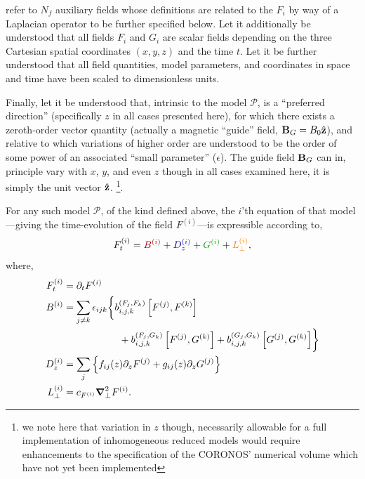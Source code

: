 \documentclass[12pt, letterpaper, oneside, leqno, openright]{memoir}
\newcommand{\coronos}{\textsf{CORONOS}}
\newcommand{\pmodel}{\mathscr{P}}
\begin{document}
refer to $N_f$ auxiliary fields whose definitions are related to the $F_i$ by
way of a Laplacian operator to be further specified below. Let it additionally
be understood that all fields $F_i$ and $G_i$ are scalar fields depending on
the three Cartesian spatial coordinates $(x,y,z)$ and the time $t$. Let it be
further understood that all field quantities, model parameters, and coordinates
in space and time have been scaled to dimensionless units. 
%
\par
%
Finally, let it be understood that, intrinsic to the model $\pmodel$, is a
``preferred direction'' (specifically $z$ in all cases presented here),
for which there exists a zeroth-order vector quantity (actually a magnetic
``guide'' field, $\mathbf{B}_G=B_0\hat{\mathbf{z}}$), and relative to which variations of
higher order are understood to be the order of some power of an associated
``small parameter'' ($\epsilon$). The guide field $\mathbf{B}_G$ can in, principle
vary with $x$, $y$, and even $z$ though in all cases examined here,
it is simply the unit vector $\hat{\mathbf{z}}$. \footnote{we note here that variation
in $z$ though, necessarily allowable for a full implementation of inhomogeneous
reduced models would require enhancements to the specification of the \coronos'
numerical volume which have not yet been implemented}.
%
\par
%
For any such model $\pmodel$, of the kind defined above, the $i$'th equation of
that model---giving the time-evolution of the field $F^{(i)}$---is expressible
according to,
%
\begin{equation}
  F^{(i)}_t = { \color{red!65!black} B^{(i)}}
            + { \color{blue!65!black} D^{(i)}_z}
            + { \color{green!65!black}G^{(i)}}
            + { \color{orange} L^{(i)}_\perp},
            \label{eq:redmodabs}
\end{equation}
%
where,
%
\begin{subequations}
  \begin{align}
%
   F^{(i)}_t      &=\pardt F^{(i)}                                                                   \\
   B^{(i)}        &=
   \sum_{j \ne k}\epsilon_{ijk}\biggl\{   b^{(F_j,F_k)}_{i,j,k}\left[F^{(j)},F^{(k)}\right] \nonumber \\
                  &\hspace{2cm}       +  b^{(F_j,G_k)}_{i,j,k}\left[F^{(j)},G^{(k)}\right]
                                      +  b^{(G_j,G_k)}_{i,j,k}\left[G^{(j)},G^{(k)}\right]
                                \biggr\}                                                              \\
   D_z^{(i)}      &=\sum_{j} \left\{f_{ij}(z)\pardz F^{(j)} + g_{ij}(z)\pardz G^{(j)}\right\}        \\
   L^{(i)}_\perp  &= c_{F^{(i)}}\delperp^2F^{(i)}.
%
  \end{align}
\end{subequations}
\end{document}

